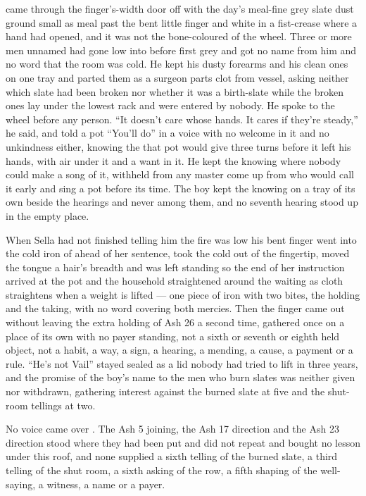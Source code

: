  came through the finger's-width door off  with the day's meal-fine grey slate dust ground small as meal past the bent little finger and white in a fist-crease where a hand had opened, and it was not the bone-coloured  of the wheel. Three or more men unnamed had gone low into  before first grey and got no name from him and no word that the room was cold. He kept his dusty forearms and his clean ones on one tray and parted them as a surgeon parts clot from vessel, asking neither which slate had been broken nor whether it was a birth-slate while the broken ones lay under the lowest rack and were entered by nobody. He spoke to the wheel before any person. “It doesn't care whose hands. It cares if they're steady,” he said, and told a pot “You'll do” in a voice with no welcome in it and no unkindness either, knowing the  that pot would give three turns before it left his hands, with air under it and a want in it. He kept the knowing where nobody could make a song of it, withheld from any master come up from  who would call it early and sing a pot before its time. The boy kept the knowing on a tray of its own beside the hearings and never among them, and no seventh hearing stood up in the empty place.

When Sella had not finished telling him the fire was low his bent finger went into the cold iron of  ahead of her sentence, took the cold out of the fingertip, moved the tongue a hair's breadth and was left standing so the end of her instruction arrived at the pot and the household straightened around the waiting as cloth straightens when a weight is lifted --- one piece of iron with two bites, the holding and the taking, with no  word covering both mercies. Then the finger came out without leaving the extra holding of Ash 26 a second time, gathered once on a place of its own with no payer standing, not a sixth or seventh or eighth held object, not a habit, a way, a sign, a hearing, a mending, a cause, a payment or a rule. “He's not Vail” stayed sealed as a lid nobody had tried to lift in three years, and the promise of the boy's name to the men who burn slates was neither given nor withdrawn, gathering interest against the burned slate at five and the shut-room tellings at two.

\scenebreak

No voice came over . The Ash 5 joining, the Ash 17 direction and the Ash 23 direction stood where they had been put and did not repeat and bought no lesson under this roof, and none supplied a sixth telling of the burned slate, a third telling of the shut room, a sixth asking of the row, a fifth shaping of the well-saying, a witness, a name or a payer.

